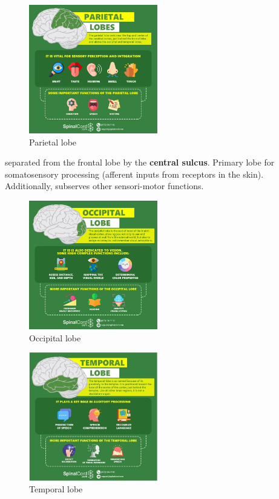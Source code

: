 \documentclass{article}
\begin{document}
\begin{figure}[h]
\centering
\includegraphics[width=0.5\textwidth]{assets/parietalLobe.png}
\caption{Parietal lobe}
\end{figure}

\noindent separated from the frontal lobe by the \textbf{central sulcus}. Primary lobe for somatosensory processing (afferent inputs from receptors in the skin). Additionally, subserves other sensori-motor functions.

\begin{figure}[h]
\centering
\includegraphics[width=0.5\textwidth]{assets/occipitalLobe.png}
\caption{Occipital lobe}
\end{figure}

\begin{figure}[h]
\centering
\includegraphics[width=0.5\textwidth]{assets/temporalLobe.png}
\caption{Temporal lobe}
\end{figure}
\end{document}
